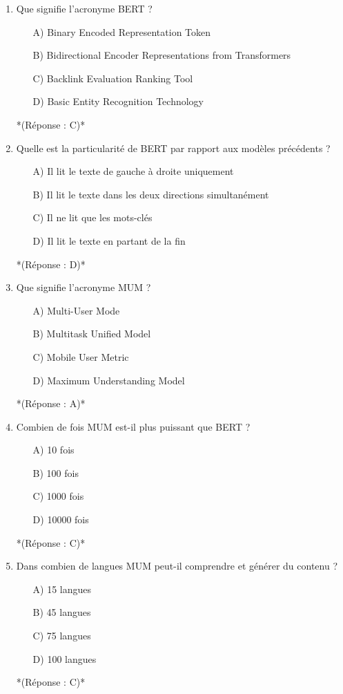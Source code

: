 \documentclass[12pt,a4paper,twoside]{report}
\begin{document}
\begin{enumerate}
\item Que signifie l'acronyme BERT ?
\begin{itemize}
\item[A)] Binary Encoded Representation Token
\item[B)] Bidirectional Encoder Representations from Transformers
\item[C)] Backlink Evaluation Ranking Tool
\item[D)] Basic Entity Recognition Technology
\end{itemize}
*(Réponse : C)*

\item Quelle est la particularité de BERT par rapport aux modèles précédents ?
\begin{itemize}
\item[A)] Il lit le texte de gauche à droite uniquement
\item[B)] Il lit le texte dans les deux directions simultanément
\item[C)] Il ne lit que les mots-clés
\item[D)] Il lit le texte en partant de la fin
\end{itemize}
*(Réponse : D)*

\item Que signifie l'acronyme MUM ?
\begin{itemize}
\item[A)] Multi-User Mode
\item[B)] Multitask Unified Model
\item[C)] Mobile User Metric
\item[D)] Maximum Understanding Model
\end{itemize}
*(Réponse : A)*

\item Combien de fois MUM est-il plus puissant que BERT ?
\begin{itemize}
\item[A)] 10 fois
\item[B)] 100 fois
\item[C)] 1000 fois
\item[D)] 10000 fois
\end{itemize}
*(Réponse : C)*

\item Dans combien de langues MUM peut-il comprendre et générer du contenu ?
\begin{itemize}
\item[A)] 15 langues
\item[B)] 45 langues
\item[C)] 75 langues
\item[D)] 100 langues
\end{itemize}
*(Réponse : C)*


\end{enumerate}
\end{document}
